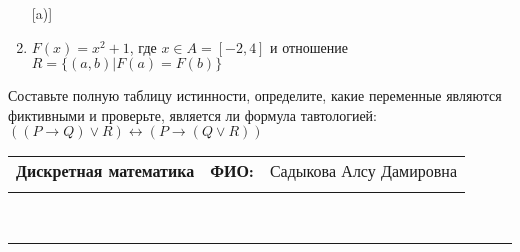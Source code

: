\documentclass[10pt]{exam}
\newcommand{\class}{Дискретная математика}
\newcommand{\examdate}{}
\begin{document}
\begin{questions}
\begin{enumerate} [a)]
\item $F(x)=x^{2}+1$, где $x \in A = [-2, 4]$ и отношение $R = \{(a,b)|F(a) = F(b)\}$
\end{enumerate}\question Составьте полную таблицу истинности, определите, какие переменные являются фиктивными и проверьте, является ли формула тавтологией:
$((P \rightarrow Q) \lor R) \leftrightarrow (P \rightarrow (Q \lor R))$

\end{questions}
\newpage
\begin{flushright}
\begin{tabular}{p{2.8in} r l}
\textbf{\class} & \textbf{ФИО:} &Садыкова Алсу Дамировна
\\

\textbf{\examdate} &&\\
\end{tabular}\\
\end{flushright}
\rule[1ex]{\textwidth}{.1pt}
\end{document}
